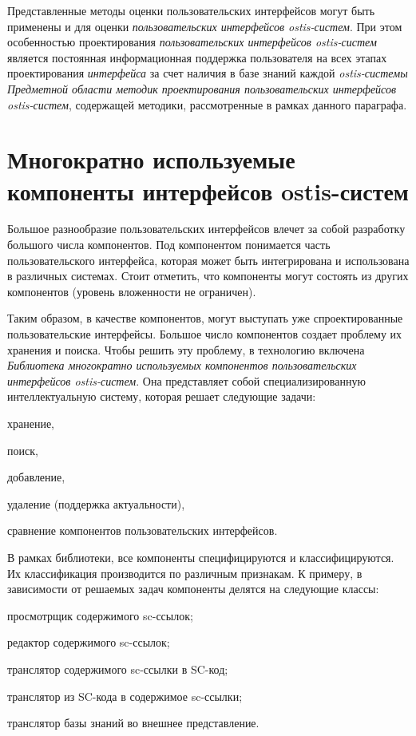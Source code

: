Представленные методы оценки пользовательских интерфейсов могут быть применены и для оценки \textit{пользовательских интерфейсов ostis-систем}. При этом особенностью проектирования \textit{пользовательских интерфейсов ostis-систем} является постоянная информационная поддержка пользователя на всех этапах проектирования \textit{интерфейса} за счет наличия в базе знаний каждой \textit{ostis-системы} \textit{Предметной области методик проектирования пользовательских интерфейсов ostis-систем}, содержащей методики, рассмотренные в рамках данного параграфа.


\section{Многократно используемые компоненты интерфейсов ostis-систем}
\label{sec_reusable_UI_components}

Большое разнообразие пользовательских интерфейсов влечет за собой разработку большого числа компонентов. Под компонентом понимается часть пользовательского интерфейса, которая может быть интегрирована и использована в различных системах.
Стоит отметить, что компоненты могут состоять из других компонентов (уровень вложенности не ограничен). 

Таким образом, в качестве компонентов, могут выступать уже спроектированные
пользовательские интерфейсы. Большое число компонентов создает проблему их хранения и поиска. Чтобы решить эту проблему, в технологию включена \textit{Библиотека многократно используемых компонентов пользовательских интерфейсов ostis-систем}. Она представляет собой специализированную интеллектуальную систему, которая решает следующие задачи:
\begin{textitemize}
	\item хранение,
	\item поиск,
	\item добавление,
	\item удаление (поддержка актуальности),
	\item сравнение компонентов пользовательских интерфейсов.
\end{textitemize}

В рамках библиотеки, все компоненты специфицируются и классифицируются. Их
классификация производится по различным признакам. К примеру, в зависимости от решаемых задач компоненты делятся на следующие классы:

\begin{textitemize}
	\item просмотрщик содержимого sc-ссылок;
	\item редактор содержимого sc-ссылок;
	\item транслятор содержимого sc-ссылки в SC-код;
	\item транслятор из SC-кода в содержимое sc-ссылки;
	\item транслятор базы знаний во внешнее представление.
\end{textitemize}

